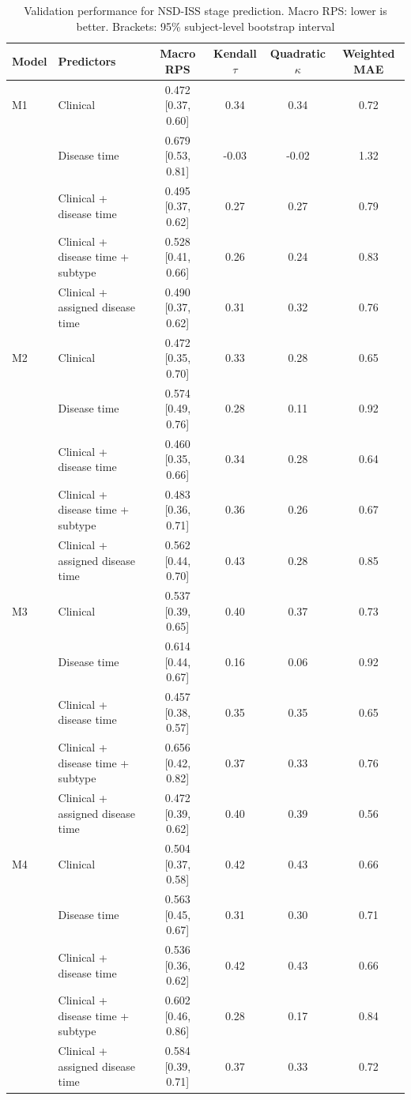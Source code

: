 \begin{table}[ht]
\caption{Validation performance for NSD-ISS stage prediction. Macro RPS: lower is better. Brackets: 95\% subject-level bootstrap interval}
\centering
\begin{tabular}{l l c c c c}
\hline\hline
Model & Predictors & Macro RPS & Kendall $\tau$ & Quadratic $\kappa$ & Weighted MAE \\ [0.5ex]
\hline
M1 & Clinical & 0.472 [0.37, 0.60] & 0.34 & 0.34 & 0.72 \\
 & Disease time & 0.679 [0.53, 0.81] & -0.03 & -0.02 & 1.32 \\
 & Clinical + disease time & 0.495 [0.37, 0.62] & 0.27 & 0.27 & 0.79 \\
 & Clinical + disease time + subtype & 0.528 [0.41, 0.66] & 0.26 & 0.24 & 0.83 \\
 & Clinical + assigned disease time & 0.490 [0.37, 0.62] & 0.31 & 0.32 & 0.76 \\
\hline
M2 & Clinical & 0.472 [0.35, 0.70] & 0.33 & 0.28 & 0.65 \\
 & Disease time & 0.574 [0.49, 0.76] & 0.28 & 0.11 & 0.92 \\
 & Clinical + disease time & 0.460 [0.35, 0.66] & 0.34 & 0.28 & 0.64 \\
 & Clinical + disease time + subtype & 0.483 [0.36, 0.71] & 0.36 & 0.26 & 0.67 \\
 & Clinical + assigned disease time & 0.562 [0.44, 0.70] & 0.43 & 0.28 & 0.85 \\
\hline
M3 & Clinical & 0.537 [0.39, 0.65] & 0.40 & 0.37 & 0.73 \\
 & Disease time & 0.614 [0.44, 0.67] & 0.16 & 0.06 & 0.92 \\
 & Clinical + disease time & 0.457 [0.38, 0.57] & 0.35 & 0.35 & 0.65 \\
 & Clinical + disease time + subtype & 0.656 [0.42, 0.82] & 0.37 & 0.33 & 0.76 \\
 & Clinical + assigned disease time & 0.472 [0.39, 0.62] & 0.40 & 0.39 & 0.56 \\
\hline
M4 & Clinical & 0.504 [0.37, 0.58] & 0.42 & 0.43 & 0.66 \\
 & Disease time & 0.563 [0.45, 0.67] & 0.31 & 0.30 & 0.71 \\
 & Clinical + disease time & 0.536 [0.36, 0.62] & 0.42 & 0.43 & 0.66 \\
 & Clinical + disease time + subtype & 0.602 [0.46, 0.86] & 0.28 & 0.17 & 0.84 \\
 & Clinical + assigned disease time & 0.584 [0.39, 0.71] & 0.37 & 0.33 & 0.72 \\
\hline
\end{tabular}
\label{tab:nsd_results}
\end{table}
